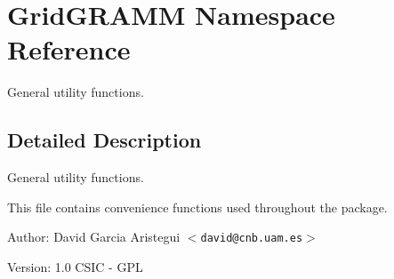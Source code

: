 \section{Grid\-GRAMM Namespace Reference}
\label{namespaceGridGRAMM}
General utility functions.  




\subsection{Detailed Description}
General utility functions. 

This file contains convenience functions used throughout the package.

\begin{Desc}
\item[Author:]David Garcia Aristegui $<${\tt david@cnb.uam.es}$>$ \end{Desc}
\begin{Desc}
\item[Version:]1.0  CSIC - GPL \end{Desc}


